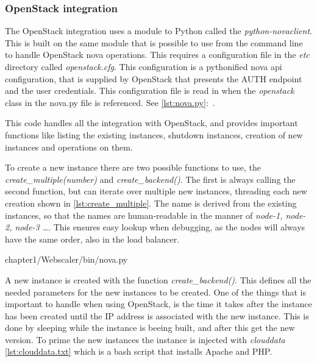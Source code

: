 \subsubsection{OpenStack integration}
The OpenStack integration uses a module to Python called the
\textit{python-novaclient}. This is built on the same module that is possible
to use from the command line to handle OpenStack nova operations. This
requires a configuration file in the \textit{etc} directory called
\textit{openstack.cfg}. This configuration is a pythonified nova api
configuration, that is supplied by OpenStack that presents the AUTH endpoint
and the user credentials.
This configuration file is read in when the \textit{openstack} class in the
nova.py file is referenced. See \ref{lst:nova.py}:~.

This code handles all the integration with OpenStack, and provides important
functions like listing the existing instances, shutdown instances, creation of
new instances and operations on them.

To create a new instance there are two possible functions to use, the
\textit{create\_multiple(number)} and \textit{create\_backend()}. The first is
always calling the second function, but can iterate over multiple new
instances, threading each new creation shown in \ref{lst:create_multiple}. The name
is derived from the existing instances, so that the names are human-readable in
the manner of \textit{node-1, node-2, node-3 \dots}. This ensures easy lookup
when debugging, as the nodes will always have the same order, also in the load
balancer.

\begin{center}

{chapter1/Webscaler/bin/nova.py}
\end{center}

A new instance is created with the function \textit{create\_backend()}. This
defines all the needed parameters for the new instances to be created.
One of the things that is important to handle when using OpenStack, is the time
it takes after the instance has been created until the IP address is associated
with the new instance. This is done by sleeping while the instance is beeing
built, and after this get the new version.
To prime the new instances the instance is injected with \textit{clouddata}
\ref{lst:clouddata.txt} which is a bash script that installs Apache and PHP.

